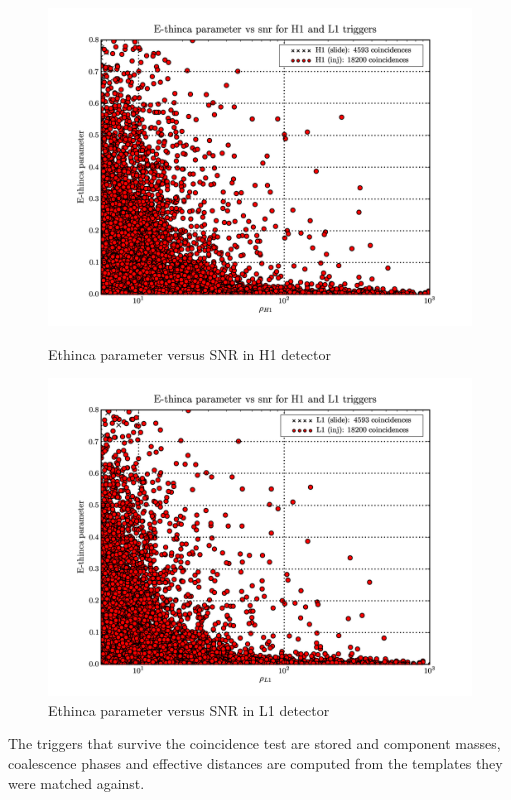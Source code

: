 \documentclass[epsf]{article}
\begin{document}
\begin{figure}[ht]
\begin{minipage}[b]{0.5\linewidth}
\centering
\includegraphics[scale=0.15]{Ethinca_H1.png}
\caption{Ethinca parameter versus SNR in H1 detector}
\label{fig:figure5}
\end{minipage}
\hspace{0.5cm}
\begin{minipage}[b]{0.5\linewidth}
\centering
\includegraphics[scale=0.15]{Ethinca_L1.png}
\caption{Ethinca parameter versus SNR in L1 detector}
\label{fig:figure6}
\end{minipage}
\end{figure}

 The triggers that survive the coincidence test are stored and component masses, coalescence phases and effective distances are computed from the templates they were matched against. 
\end{document}
